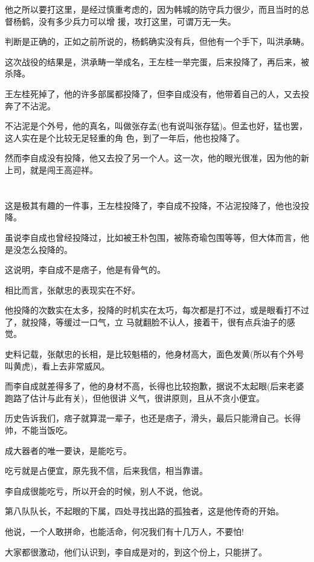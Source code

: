 \documentclass[11pt,a4paper,onecolumn]{article}
\begin{document}
他之所以要打这里，是经过慎重考虑的，因为韩城的防守兵力很少，而且当时的总督杨鹤，没有多少兵力可以增
援，攻打这里，可谓万无一失。

判断是正确的，正如之前所说的，杨鹤确实没有兵，但他有一个手下，叫洪承畴。

这次战役的结果是，洪承畴一举成名，王左桂一举完蛋，后来投降了，再后来，被杀降。

王左桂死掉了，他的许多部属都投降了，但李自成没有，他带着自己的人，又去投奔了不沾泥。

不沾泥是个外号，他的真名，叫做张存孟(也有说叫张存猛)。但孟也好，猛也罢，这人实在是个比较无足轻重的角
色，到了一年后，他也投降了。

然而李自成没有投降，他又去投了另一个人。这一次，他的眼光很准，因为他的新上司，就是闯王高迎祥。

\section[\thesection]{}

这是极其有趣的一件事，王左桂投降了，李自成不投降，不沾泥投降了，他也没投降。

虽说李自成也曾经投降过，比如被王朴包围，被陈奇瑜包围等等，但大体而言，他是没怎么投降的。

这说明，李自成不是痞子，他是有骨气的。

相比而言，张献忠的表现实在不好。

他投降的次数实在太多，投降的时机实在太巧，每次都是打不过，或是眼看打不过了，就投降，等缓过一口气，立
马就翻脸不认人，接着干，很有点兵油子的感觉。

史料记载，张献忠的长相，是比较魁梧的，他身材高大，面色发黄(所以有个外号叫黄虎)，看上去非常威风。

而李自成就差得多了，他的身材不高，长得也比较抱歉，据说不太起眼(后来老婆跑路了估计与此有关)，但他很讲
义气，很讲原则，且从不贪小便宜。

历史告诉我们，痞子就算混一辈子，也还是痞子，滑头，最后只能滑自己。长得帅，不能当饭吃。

成大器者的唯一要诀，是能吃亏。

吃亏就是占便宜，原先我不信，后来我信，相当靠谱。

李自成很能吃亏，所以开会的时候，别人不说，他说。

第八队队长，不起眼的下属，四处寻找出路的孤独者，这是他传奇的开始。

他说，一个人敢拼命，也能活命，何况我们有十几万人，不要怕!

大家都很激动，他们认识到，李自成是对的，到这个份上，只能拼了。
\end{document}
